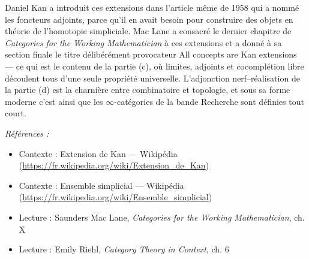 \documentclass[11pt]{article}
\newenvironment{refs}{\par\small\noindent\emph{Références :}\begin{itemize}\setlength\itemsep{0pt}}{\end{itemize}\normalsize}
\begin{document}
\noindent Daniel Kan a introduit ces extensions dans l'article même de 1958 qui a nommé les
foncteurs adjoints, parce qu'il en avait besoin pour construire des objets en théorie de
l'homotopie simpliciale. Mac Lane a consacré le dernier chapitre de \textit{Categories for the Working
Mathematician} à ces extensions et a donné à sa section finale le titre délibérément provocateur
\og{} All concepts are Kan extensions \fg{} --- ce qui est le contenu de la partie (c), où limites, adjoints
et cocomplétion libre découlent tous d'une seule propriété universelle. L'adjonction
nerf--réalisation de la partie (d) est la charnière entre combinatoire et topologie, et sous sa
forme moderne c'est ainsi que les $\infty$-catégories de la bande Recherche sont définies tout court.

\begin{refs}
\item Contexte : Extension de Kan --- Wikipédia (\url{https://fr.wikipedia.org/wiki/Extension_de_Kan})
\item Contexte : Ensemble simplicial --- Wikipédia (\url{https://fr.wikipedia.org/wiki/Ensemble_simplicial})
\item Lecture : Saunders Mac Lane, \textit{Categories for the Working Mathematician}, ch. X
\item Lecture : Emily Riehl, \textit{Category Theory in Context}, ch. 6
\end{refs}

\bigskip
\end{document}
